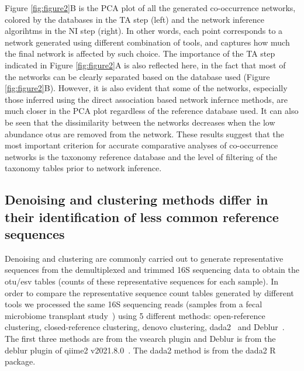   Figure \ref{fig:figure2}B is the PCA plot of all the generated co-occurrence networks, colored by the databases in the TA step (left) and the network inference algorihtms in the NI step (right).
  In other words, each point corresponds to a network generated using different combination of tools, and captures how much the final network is affected by such choice.
  The importance of the TA step indicated in Figure \ref{fig:figure2}A is also reflected here, in the fact that most of the networks can be clearly separated based on the database used (Figure \ref{fig:figure2}B).
  However, it is also evident that some of the networks, especially those inferred using the direct association based network infernce methods, are much closer in the PCA plot regardless of the reference database used.
  It can also be seen that the dissimilarity between the networks decreases when the low abundance \ac{otu}s are removed from the network.
  These results suggest that the most important criterion for accurate comparative analyses of co-occurrence networks is the taxonomy reference database and the level of filtering of the taxonomy tables prior to network inference.

  \FloatBarrier

  \subsection*{Denoising and clustering methods differ in their identification of less common reference sequences}

  Denoising and clustering are commonly carried out to generate representative sequences from the demultiplexed and trimmed 16S sequencing data to obtain the \ac{otu}/\ac{esv} tables (counts of these representative sequences for each sample).
  In order to compare the representative sequence count tables generated by different tools we processed the same 16S sequencing reads (samples from a fecal microbiome transplant study~\cite{Kang2017}) using 5 different methods: open-reference clustering, closed-reference clustering, denovo clustering, \ac{dada2}~\cite{Callahan2016} and Deblur~\cite{Amir2017}.
  The first three methods are from the vsearch plugin and Deblur is from the deblur plugin of \ac{qiime2} v2021.8.0~\cite{bolyenReproducibleInteractiveScalable2019}.
  The \ac{dada2} method is from the \ac{dada2} R package.

